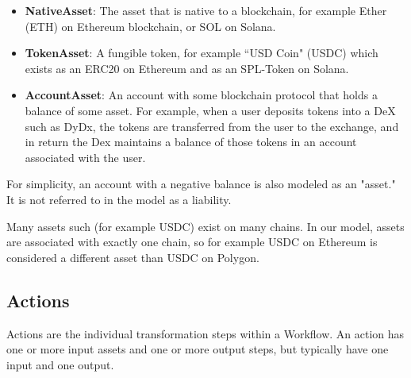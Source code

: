 \documentclass[oneside]{article}
\begin{document}
\begin{itemize}
  \item \textbf{NativeAsset}: The asset that is native to a blockchain, for example Ether (ETH) on Ethereum blockchain, or SOL on Solana.
  \item \textbf{TokenAsset}: A fungible token, for example ``USD Coin" (USDC) which exists as an ERC20 on Ethereum and as an SPL-Token on Solana.
  \item \textbf{AccountAsset}:  An account with some blockchain protocol that holds a balance of some asset.  For example, when a user deposits tokens into a DeX such as DyDx, 
  the tokens are transferred from the user to the exchange, and in return the Dex maintains a balance of those tokens in an account associated with the user. 
\end{itemize}
For simplicity, an account with a negative balance is also modeled as an "asset."  It is not referred to in the model as a liability.

Many assets such (for example USDC) exist on many chains.  In our model, assets are associated with exactly one chain, so for example USDC on Ethereum is considered a different 
asset than USDC on Polygon.

\subsection*{Actions}
Actions are the individual transformation steps within a Workflow.  An action has one or more input assets and one or more output steps, but typically have one input and one output.
\begin{center}
\end{center}
\end{document}
